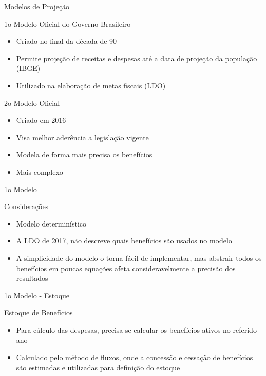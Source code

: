 \begin{frame}{Modelos de Projeção}
  \begin{block}{1o Modelo Oficial do Governo Brasileiro}
    \begin{itemize}
      \item Criado no final da década de 90
      \item Permite projeção de receitas e despesas até a data de projeção da
      população (IBGE)
      \item Utilizado na elaboração de metas fiscais (LDO)
    \end{itemize}
  \end{block}

  \begin{block}{2o Modelo Oficial}
    \begin{itemize}
      \item Criado em 2016
      \item Visa melhor aderência a legislação vigente
      \item Modela de forma mais precisa os benefícios
      \item Mais complexo
    \end{itemize}
  \end{block}
\end{frame}

\begin{frame}{1o Modelo}
  \begin{block}{Considerações}
    \begin{itemize}
      \item Modelo determinístico
      \item  A LDO de 2017, não descreve quais benefícios são usados no modelo
      \item  A simplicidade do modelo o torna fácil de implementar, mas abstrair
      todos os benefícios em poucas equações afeta consideravelmente a
      precisão dos resultados
    \end{itemize}
  \end{block}
\end{frame}

\begin{frame}{1o Modelo - Estoque}
  \begin{block}{Estoque de Benefícios}
    \begin{itemize}
      \item Para cálculo das despesas, precisa-se calcular os \alert{benefícios
      ativos} no referido ano
      \item Calculado pelo método de fluxos, onde a concessão e cessação de
      benefícios são estimadas e utilizadas para definição do estoque
    \end{itemize}
  \end{block}
\end{frame}

